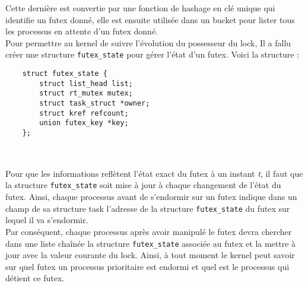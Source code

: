 Cette dernière est convertie par une fonction de hashage en clé unique qui 
identifie un futex donné, elle est ensuite utilisée dans un bucket pour lister
tous les processus en attente d'un futex donné.
\\

Pour permettre au kernel de suivre l'évolution du possesseur du lock, Il a
fallu créer une structure \verb|futex_state| pour gérer l'état d'un futex. Voici la structure :
\begin{lstlisting}
	struct futex_state {
		struct list_head list;
		struct rt_mutex mutex;
		struct task_struct *owner;
		struct kref refcount;
		union futex_key *key;
	};
	
\end{lstlisting}
\\

Pour que les informations reflètent l'état exact du futex
à un instant \textit{t}, il faut que la structure \verb|futex_state| soit mise à jour
à chaque changement de l'état du futex. Ainsi, chaque processus avant de 
s'endormir sur un futex indique dans un champ de sa structure task l'adresse de 
la structure \verb|futex_state| du futex sur lequel il va s'endormir.
\\

Par conséquent, chaque processus après avoir manipulé le futex 
devra chercher dans une liste chaînée la structure \verb|futex_state| associée au 
futex et la mettre à jour avec la valeur courante du lock. Ainsi, à tout moment le kernel peut savoir sur quel futex un processus prioritaire est endormi 
et quel est le processus qui détient ce futex.